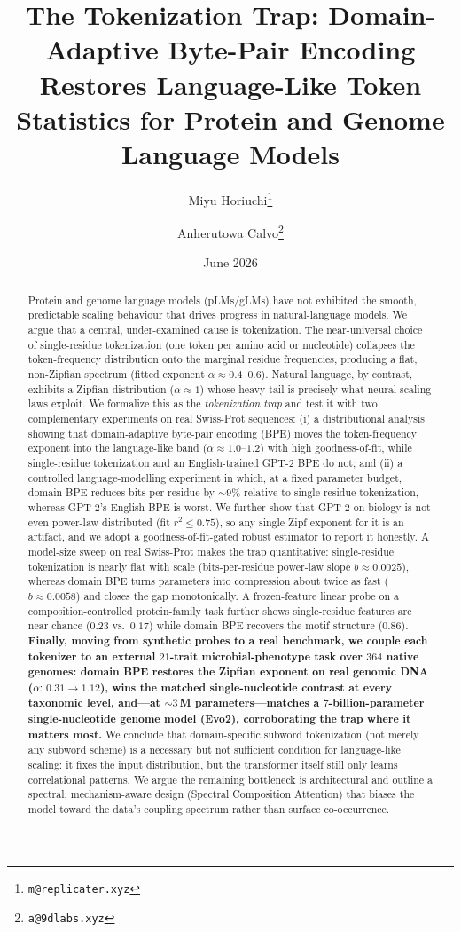\documentclass[11pt]{article}
\title{\textbf{The Tokenization Trap: Domain-Adaptive Byte-Pair Encoding
Restores Language-Like Token Statistics for Protein and Genome
Language Models}}
\author{Miyu Horiuchi\thanks{\texttt{m@replicater.xyz}} \and
Anherutowa Calvo\thanks{\texttt{a@9dlabs.xyz}}}
\date{June 2026}
\begin{document}
\maketitle

\begin{abstract}
Protein and genome language models (pLMs/gLMs) have not exhibited the smooth,
predictable scaling behaviour that drives progress in natural-language models.
We argue that a central, under-examined cause is tokenization. The
near-universal choice of single-residue tokenization (one token per amino acid
or nucleotide) collapses the token-frequency distribution onto the marginal
residue frequencies, producing a flat, non-Zipfian spectrum (fitted exponent
$\alpha \approx 0.4$--$0.6$). Natural language, by contrast, exhibits a Zipfian
distribution ($\alpha \approx 1$) whose heavy tail is precisely what neural
scaling laws exploit. We formalize this as the \emph{tokenization trap} and
test it with two complementary experiments on real Swiss-Prot sequences: (i) a
distributional analysis showing that domain-adaptive byte-pair encoding (BPE)
moves the token-frequency exponent into the language-like band ($\alpha \approx
1.0$--$1.2$) with high goodness-of-fit, while single-residue tokenization and
an English-trained GPT-2 BPE do not; and (ii) a controlled language-modelling
experiment in which, at a fixed parameter budget, domain BPE reduces
bits-per-residue by ${\sim}9\%$ relative to single-residue tokenization,
whereas GPT-2's English BPE is worst. We further show that GPT-2-on-biology is
not even power-law distributed (fit $r^2 \le 0.75$), so any single Zipf exponent
for it is an artifact, and we adopt a goodness-of-fit-gated robust estimator to
report it honestly. A model-size sweep on real Swiss-Prot makes the trap
quantitative: single-residue tokenization is nearly flat with scale
(bits-per-residue power-law slope $b \approx 0.0025$), whereas domain BPE turns
parameters into compression about twice as fast ($b \approx 0.0058$) and closes
the gap monotonically. A frozen-feature linear probe on a composition-controlled
protein-family task further shows single-residue features are near chance
($0.23$ vs.\ $0.17$) while domain BPE recovers the motif structure ($0.86$).
\textbf{Finally, moving from synthetic probes to a real benchmark, we couple
each tokenizer to an external $21$-trait microbial-phenotype task over $364$
native genomes: domain BPE restores the Zipfian exponent on real genomic DNA
($\alpha\!:\,0.31\!\to\!1.12$), wins the matched single-nucleotide contrast at
every taxonomic level, and---at ${\sim}3$\,M parameters---matches a
$7$-billion-parameter single-nucleotide genome model (Evo2), corroborating the
trap where it matters most.} We conclude that domain-specific subword
tokenization (not merely any subword scheme) is a necessary but not sufficient
condition for language-like scaling: it fixes the input distribution, but the
transformer itself still only learns correlational patterns. We argue the
remaining bottleneck is architectural and outline a spectral, mechanism-aware
design (Spectral Composition Attention) that biases the model toward the data's
coupling spectrum rather than surface co-occurrence.
\end{abstract}
\end{document}
